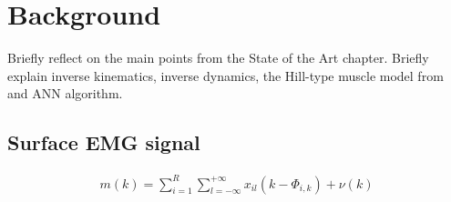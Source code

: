 \documentclass[../main.tex]{subfiles}
\begin{document}
\chapter{Background}
Briefly reflect on the main points from the State of the Art chapter.
Briefly explain inverse kinematics, inverse dynamics, the Hill-type muscle model from \cite{Pizzolato2015} and ANN algorithm.

\section{Surface EMG signal}
\begin{align}
    m(k) = \sum_{i=1}^R \sum_{l=-\infty}^{+\infty}x_{il}\left(k-\Phi_{i,k}\right) + \nu (k)
\end{align}
\end{document}
